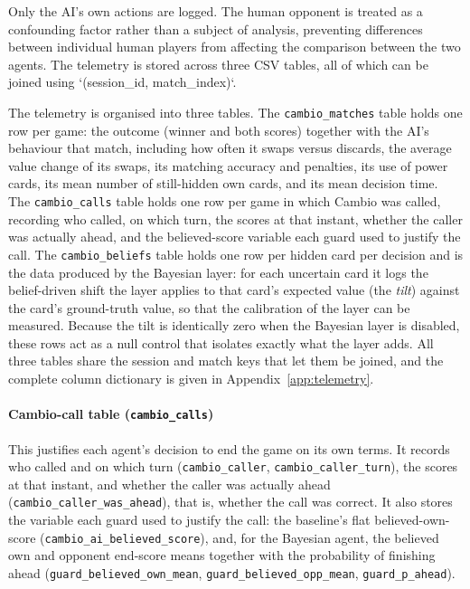 \documentclass[12pt,a4paper,oneside]{report}
\begin{document}
Only the AI’s own actions are logged. The human opponent is treated as a confounding factor rather than a subject of analysis, preventing differences between individual human players from affecting the comparison between the two agents. The telemetry is stored across three CSV tables, all of which can be joined using `(session\_id, match\_index)`.


The telemetry is organised into three tables. The \texttt{cambio\_matches} table holds one row per game: the outcome (winner and both scores) together with the AI's behaviour that match, including how often it swaps versus discards, the average value change of its swaps, its matching accuracy and penalties, its use of power cards, its mean number of still-hidden own cards, and its mean decision time. The \texttt{cambio\_calls} table holds one row per game in which Cambio was called, recording who called, on which turn, the scores at that instant, whether the caller was actually ahead, and the believed-score variable each guard used to justify the call. The \texttt{cambio\_beliefs} table holds one row per hidden card per decision and is the data produced by the Bayesian layer: for each uncertain card it logs the belief-driven shift the layer applies to that card's expected value (the \emph{tilt}) against the card's ground-truth value, so that the calibration of the layer can be measured. Because the tilt is identically zero when the Bayesian layer is disabled, these rows act as a null control that isolates exactly what the layer adds. All three tables share the session and match keys that let them be joined, and the complete column dictionary is given in Appendix~\ref{app:telemetry}.

\paragraph{Cambio-call table (\texttt{cambio\_calls})}
This justifies each agent's decision to end the game on its own terms. It records
who called and on which turn (\texttt{cambio\_caller},
\texttt{cambio\_caller\_turn}), the scores at that instant, and whether the caller
was actually ahead (\texttt{cambio\_caller\_was\_ahead}), that is, whether the call
was correct. It also stores the variable each guard used to justify the call: the
baseline's flat believed-own-score (\texttt{cambio\_ai\_believed\_score}), and, for
the Bayesian agent, the believed own and opponent end-score means together with the
probability of finishing ahead (\texttt{guard\_believed\_own\_mean},
\texttt{guard\_believed\_opp\_mean}, \texttt{guard\_p\_ahead}).
\end{document}
